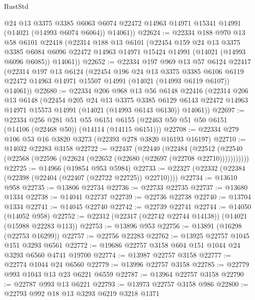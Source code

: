 \begin{lexlean}{RustStd}
\begin{coremodule}
        @24
        @13
        @3375
        @3385
        @6063
        @6074
        @22472
        @14963
        @14971
        @15341
        @14991
        (@14021 (@14993 @6074 @6064))
        @14061))
@22624 := @22334
    @188
    @970
    @13
    @58
    @6101
    @22418
    (@22314
      @188
      @13
      @6101
      (@22454
        @159
        @24
        @13
        @3375
        @3385
        @6084
        @6096
        @22472
        @14963
        @14971
        @15424
        @14991
        (@14021 (@14993 @6096 @6085))
        @14061))
@22652 := @22334
    @197
    @969
    @13
    @57
    @6124
    @22417
    (@22314
      @197
      @13
      @6124
      (@22454
        @196
        @24
        @13
        @3375
        @3385
        @6106
        @6119
        @22472
        @14963
        @14971
        @15507
        @14991
        (@14021 (@14993 @6119 @6107))
        @14061))
@22680 := @22334
    @206
    @968
    @13
    @56
    @6148
    @22416
    (@22314
      @206
      @13
      @6148
      (@22454
        @205
        @24
        @13
        @3375
        @3385
        @6129
        @6143
        @22472
        @14963
        @14971
        @15573
        @14991
        (@14021 (@14993 @6143 @6130))
        @14061))
@22697 := @22334
    @256
    @281
    @51
    @55
    @6151
    @6155
    (@22463 @50 @51 @50 @6151 (@14106 (@22468 @50)) (@14114 (@14115 @6151)))
@22708 := @22334 @279 @106 @53 @16 @3820 @3273 (@22393 @278 @3820 @16193 @16197)
@22710 := @14032 @22283 @3158
@22722 := @22437
    (@22440
      (@22484
        (@22512 (@22540 (@22568 (@22596 (@22624 (@22652 (@22680 (@22697 (@22708 @22710)))))))))))
@22725 := @14966 (@19854 @953 @5984)
@22733 := @22327 (@22332 (@22384 (@22398 (@22404 (@22407 (@22722 @22725)) @22710))))
@22734 := @13610 @958
@22735 := @13806 @22734
@22736 := @22733 @22735
@22737 := @13680 @1334
@22738 := @14041 @22737
@22739 := @22736 @22738
@22740 := @13704 @1334
@22741 := @14045 @22740
@22742 := @22739 @22741
@22744 := @14050 (@14052 @958)
@22752 := @22312 (@22317 (@22742 @22744 @14138)) (@14021 (@15988 @22283 @113))
@22753 := @13896 @953
@22756 := @13891 (@16298 (@22753 @16299))
@22757 := @22756 @22283
@22762 := @13925 @22757 @1045 @151 @3293 @6561
@22772 := @19686 @22757 @3158 @604 @151 @1044 @24 @3293 @6560 @4741 @19700
@22774 := @13987 @22757 @3158
@22777 := @22774 @1044 @24 @6560
@22779 := @13996 @22757 @3158
@22785 := @22779 @993 @1043 @13 @23 @6221 @6559
@22787 := @13964 @22757 @3158
@22790 := @22787 @993 @13 @6221
@22793 := @13973 @22757 @3158 @986
@22800 := @22793 @992 @18 @13 @3293 @6219 @3218 @1371

\end{coremodule}
\end{lexlean}
